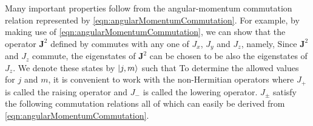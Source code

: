 Many important properties follow from the angular-momentum commutation relation represented by \autoref{eqn:angularMomentumCommutation}. For example, by making use of \autoref{eqn:angularMomentumCommutation}, we can show that the operator $\mathbf{J}^2$ defined by
commutes with any one of $J_x$, $J_y$ and $J_z$, namely,
Since $\mathbf{J}^2$ and $J_z$ commute, the eigenstates of $\mathbf{J}^2$ can be chosen to be also the eigenstates of
$J_z$. We denote these states by $| j, m \rangle$ such that
To determine the allowed values for $j$ and $m$, it is convenient to work with the non-Hermitian operators
where $J_{+}$ is called the raising operator and $J_{-}$ is called the lowering operator. $J_{\pm}$ satisfy the following
commutation relations
all of which can easily be derived from \autoref{eqn:angularMomentumCommutation}. 

